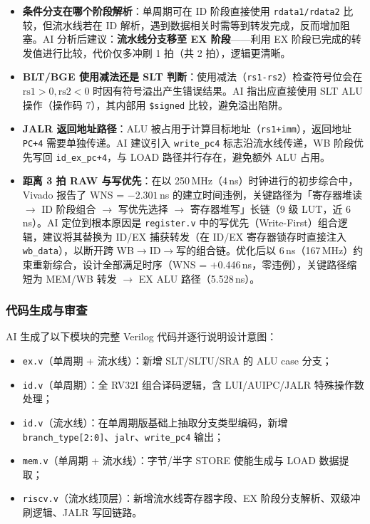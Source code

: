 \documentclass[12pt,hyperref,a4paper,UTF8]{ctexart}
\begin{document}
\begin{itemize}[leftmargin=2em]
    \item \textbf{条件分支在哪个阶段解析}：单周期可在 ID 阶段直接使用 \texttt{rdata1/rdata2} 比较，但流水线若在 ID 解析，遇到数据相关时需等到转发完成，反而增加阻塞。AI 分析后建议：\textbf{流水线分支移至 EX 阶段}——利用 EX 阶段已完成的转发值进行比较，代价仅多冲刷 1 拍（共 2 拍），逻辑更清晰。

    \item \textbf{BLT/BGE 使用减法还是 SLT 判断}：使用减法（\texttt{rs1-rs2}）检查符号位会在 $\text{rs1}>0, \text{rs2}<0$ 时因有符号溢出产生错误结果。AI 指出应直接使用 SLT ALU 操作（操作码 7），其内部用 \texttt{\$signed} 比较，避免溢出陷阱。

    \item \textbf{JALR 返回地址路径}：ALU 被占用于计算目标地址（\texttt{rs1+imm}），返回地址 \texttt{PC+4} 需要单独传递。AI 建议引入 \texttt{write\_pc4} 标志沿流水线传递，WB 阶段优先写回 \texttt{id\_ex\_pc+4}，与 LOAD 路径并行存在，避免额外 ALU 占用。

    \item \textbf{距离 3 拍 RAW 与写优先}：在以 250\,MHz（4\,ns）时钟进行的初步综合中，Vivado 报告了 WNS = $-2.301$\,ns 的建立时间违例，关键路径为「寄存器堆读 $\rightarrow$ ID 阶段组合 $\rightarrow$ 写优先选择 $\rightarrow$ 寄存器堆写」长链（9 级 LUT，近 6\,ns）。AI 定位到根本原因是 \texttt{register.v} 中的写优先（Write-First）组合逻辑，建议将其替换为 ID/EX 捕获转发（在 ID/EX 寄存器锁存时直接注入 \texttt{wb\_data}），以断开跨 WB$\to$ID$\to$写的组合链。优化后以 6\,ns（167\,MHz）约束重新综合，设计全部满足时序（WNS = $+$0.446\,ns，零违例），关键路径缩短为 MEM/WB 转发 $\rightarrow$ EX ALU 路径（5.528\,ns）。
\end{itemize}

\subsubsection{代码生成与审查}

AI 生成了以下模块的完整 Verilog 代码并逐行说明设计意图：

\begin{itemize}[leftmargin=2em]
    \item \texttt{ex.v}（单周期 + 流水线）：新增 SLT/SLTU/SRA 的 ALU case 分支；
    \item \texttt{id.v}（单周期）：全 RV32I 组合译码逻辑，含 LUI/AUIPC/JALR 特殊操作数处理；
    \item \texttt{id.v}（流水线）：在单周期版基础上抽取分支类型编码，新增 \texttt{branch\_type[2:0]}、\texttt{jalr}、\texttt{write\_pc4} 输出；
    \item \texttt{mem.v}（单周期 + 流水线）：字节/半字 STORE 使能生成与 LOAD 数据提取；
    \item \texttt{riscv.v}（流水线顶层）：新增流水线寄存器字段、EX 阶段分支解析、双级冲刷逻辑、JALR 写回链路。
\end{itemize}
\end{document}
